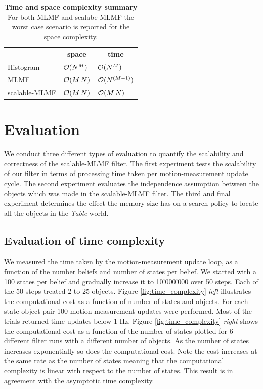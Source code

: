 \begin{table}
 \centering
 \begin{tabular}{c|c|c|}
\cline{2-3}
				        &    \textbf{space}   &     \textbf{time} \\ \hline
    \multicolumn{1}{|l}{Histogram}      & \multicolumn{1}{|l}{$\operatorname{\mathcal{O}}(N^M)$}   &  \multicolumn{1}{|l|}{$\operatorname{\mathcal{O}}(N^M)$}      \\ \hline
    \multicolumn{1}{|l}{MLMF}           & \multicolumn{1}{|l}{$\operatorname{\mathcal{O}}(M\,N)$}  &  \multicolumn{1}{|l|}{$\operatorname{\mathcal{O}}(N^{(M-1)})$} \\ \hline
    \multicolumn{1}{|l}{scalable-MLMF}  & \multicolumn{1}{|l}{$\operatorname{\mathcal{O}}(M\,N)$}  &  \multicolumn{1}{|l|}{$\operatorname{\mathcal{O}}(M\,N)$}     \\ \hline
   \end{tabular}
   \caption{\textbf{Time and space complexity summary} For both MLMF and scalabe-MLMF the worst case scenario is reported for the space complexity.}
   \label{tab:time_space_summary}
\end{table}



\section{Evaluation}\label{ch5:evaluation}

We conduct three different types of evaluation to quantify the scalability and correctness of the scalable-MLMF filter. The first experiment
tests the scalability of our filter in terms of processing time taken per motion-measurement update cycle. The second experiment evaluates the independence 
assumption between the objects which was made in the scalable-MLMF filter. The third and final experiment determines the effect the 
memory size has on a search policy to locate all the objects in the \textit{Table} world.

\subsection{Evaluation of time complexity}

We measured the time taken by the motion-measurement update loop, as a function of the number beliefs and number of states per belief. 
We started with a 100 states per belief and gradually increase it to 10'000'000 over 50 steps. Each of the 50 steps treated 2 to 25  objects. 
Figure \ref{fig:time_complexity} \textit{left} illustrates the computational
cost as a function of number of states and objects. For each state-object pair 100 motion-measurement updates were performed. Most of the trials returned time updates 
below 1 Hz. Figure \ref{fig:time_complexity} \textit{right} shows the computational cost as a function of the number of states plotted for 6 different filter runs with
a different number of objects. As the number of states increases exponentially so does the computational cost. Note the cost increases at the same
rate as the number of states meaning that the computational complexity is linear with respect to the number of states. This result is in agreement with 
the asymptotic time complexity.

